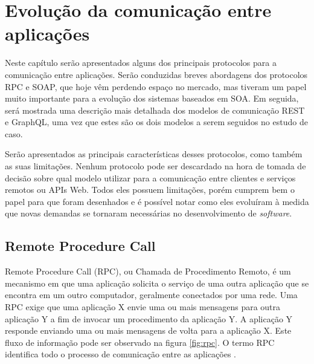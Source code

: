 \chapter[Evolução da comunicação entre aplicações]{Evolução da comunicação entre aplicações}

Neste capítulo serão apresentados alguns dos principais protocolos para a comunicação entre aplicações. Serão conduzidas breves abordagens dos protocolos RPC e SOAP, que hoje vêm perdendo espaço no mercado, mas tiveram um papel muito importante para a evolução dos sistemas baseados em SOA. Em seguida, será mostrada uma descrição mais detalhada dos modelos de comunicação REST e GraphQL, uma vez que estes são os dois modelos a serem seguidos no estudo de caso.

Serão apresentados as principais características desses protocolos, como também as suas limitações. Nenhum protocolo pode ser descardado na hora de tomada de decisão sobre qual modelo utilizar para a comunicação entre clientes e serviços remotos ou APIs Web. Todos eles possuem limitações, porém cumprem bem o papel para que foram desenhados e é possível notar como eles evoluíram à medida que novas demandas se tornaram necessárias no desenvolvimento de \textit{software}.

\section{Remote Procedure Call}\label{sec:rpc}

Remote Procedure Call (RPC), ou Chamada de Procedimento Remoto, é um mecanismo em que uma aplicação solicita o serviço de uma outra aplicação que se encontra em um outro computador, geralmente conectados por uma rede. Uma RPC exige que uma aplicação X envie uma ou mais mensagens para outra aplicação Y a fim de invocar um procedimento da aplicação Y. A aplicação Y responde enviando uma ou mais mensagens de volta para a aplicação X. Este fluxo de informação pode ser observado na figura \ref{fig:rpc}. O termo RPC identifica todo o processo de comunicação entre as aplicações \cite{merrick2006xml}.

